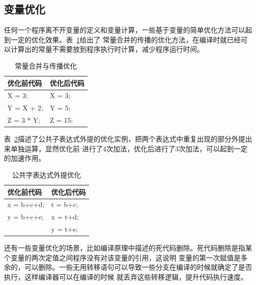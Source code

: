 \subsection{变量优化}
任何一个程序离不开变量的定义和变量计算，一些基于变量的简单优化方法可以起到一定的优化效果。表~\ref{table2}给出了
常量合并的传播的优化方法，在编译时就已经可以计算出的常量不需要放到程序执行时计算，减少程序运行时间。
\begin{table}[h]
  \centering
  \caption{常量合并与传播优化}
  \begin{tabular}{p{7cm}<{\centering}p{7cm}<{\centering}}
    \hline
    优化前代码     & 优化后代码   \\
    \hline
    X = 3;         & X = 3;    \\
    Y = X + 2;       & Y = 5; \\
    Z = 3 * Y;      & Z = 15; \\
   \hline
  \end{tabular}
  \label{table2}
\end{table}
表~\ref{table3}描述了公共子表达式外提的优化实例，把两个表达式中重复出现的部分外提出来单独运算，显然优化前
进行了4次加法，优化后进行了3次加法，可以起到一定的加速作用。
\begin{table}[h]
  \centering
  \caption{公共字表达式外提优化}
  \begin{tabular}{p{7cm}<{\centering}p{7cm}<{\centering}}
    \hline
    优化前代码      & 优化后代码   \\
    \hline
    x = b+c+d;      & t = b+c;    \\
    y = b+c+e;      & x = t+d; \\
                    & y = t+e; \\
   \hline
  \end{tabular}
  \label{table3}
\end{table}
还有一些变量优化的场景，比如编译原理中描述的死代码删除。死代码删除是指某个变量的两次定值之间程序没有对该变量的引用，这说明
变量的第一次赋值是多余的，可以删除。一些无用转移语句可以导致一些分支在编译的时候就确定了是否执行，这样编译器可以在编译的时候
就丢弃这些转移逻辑，提升代码执行速度。
